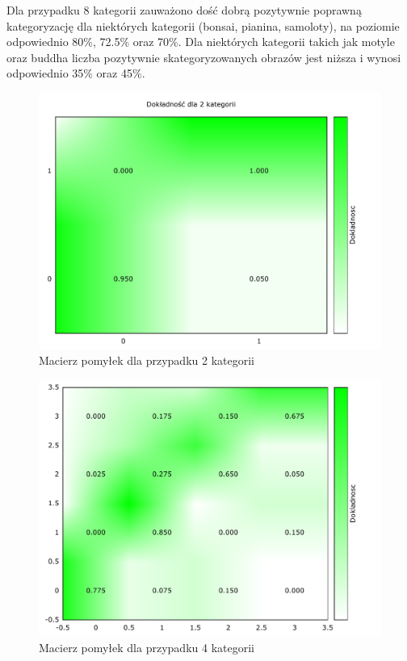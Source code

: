 Dla przypadku 8 kategorii zauważono dość dobrą pozytywnie poprawną kategoryzację dla niektórych kategorii (bonsai, pianina, samoloty), na poziomie odpowiednio 80\%, 72.5\% oraz 70\%. Dla niektórych kategorii takich jak motyle oraz buddha liczba pozytywnie skategoryzowanych obrazów jest niższa i wynosi odpowiednio 35\% oraz 45\%.

\begin{figure}[h]
	\centering
	\includegraphics[scale=1.1]{graphics/04_interpretacja_wynikow/confusion-matrix-2.pdf}
	\caption{ Macierz pomyłek dla przypadku 2 kategorii }
	\label{fig:confusion-matrix-2}
\end{figure}

\begin{figure}[h]
	\centering
	\includegraphics[scale=1.1]{graphics/04_interpretacja_wynikow/confusion-matrix-4.pdf}
	\caption{ Macierz pomyłek dla przypadku 4 kategorii }
	\label{fig:confusion-matrix-4}
\end{figure}

